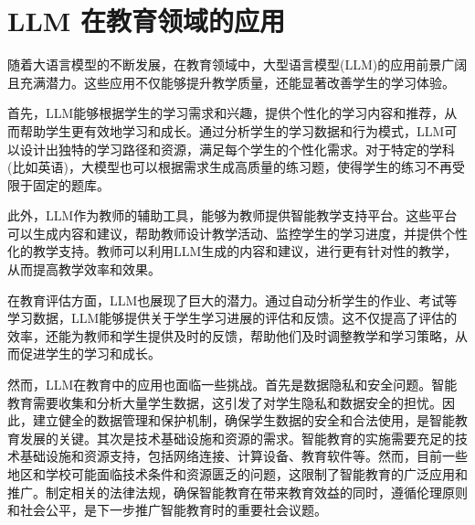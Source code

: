 \section{LLM 在教育领域的应用}

随着大语言模型的不断发展，在教育领域中，大型语言模型(LLM)的应用前景广阔且充满潜力\cite{gan2023large}。这些应用不仅能够提升教学质量，还能显著改善学生的学习体验。

首先，LLM能够根据学生的学习需求和兴趣，提供个性化的学习内容和推荐，从而帮助学生更有效地学习和成长。通过分析学生的学习数据和行为模式，LLM可以设计出独特的学习路径和资源，满足每个学生的个性化需求。对于特定的学科(比如英语)，大模型也可以根据需求生成高质量的练习题，使得学生的练习不再受限于固定的题库。

此外，LLM作为教师的辅助工具，能够为教师提供智能教学支持平台。这些平台可以生成内容和建议，帮助教师设计教学活动、监控学生的学习进度，并提供个性化的教学支持。教师可以利用LLM生成的内容和建议，进行更有针对性的教学，从而提高教学效率和效果。

在教育评估方面，LLM也展现了巨大的潜力。通过自动分析学生的作业、考试等学习数据，LLM能够提供关于学生学习进展的评估和反馈。这不仅提高了评估的效率，还能为教师和学生提供及时的反馈，帮助他们及时调整教学和学习策略，从而促进学生的学习和成长。

然而，LLM在教育中的应用也面临一些挑战。首先是数据隐私和安全问题。智能教育需要收集和分析大量学生数据，这引发了对学生隐私和数据安全的担忧。因此，建立健全的数据管理和保护机制，确保学生数据的安全和合法使用，是智能教育发展的关键。其次是技术基础设施和资源的需求。智能教育的实施需要充足的技术基础设施和资源支持，包括网络连接、计算设备、教育软件等。然而，目前一些地区和学校可能面临技术条件和资源匮乏的问题，这限制了智能教育的广泛应用和推广。制定相关的法律法规，确保智能教育在带来教育效益的同时，遵循伦理原则和社会公平，是下一步推广智能教育时的重要社会议题。